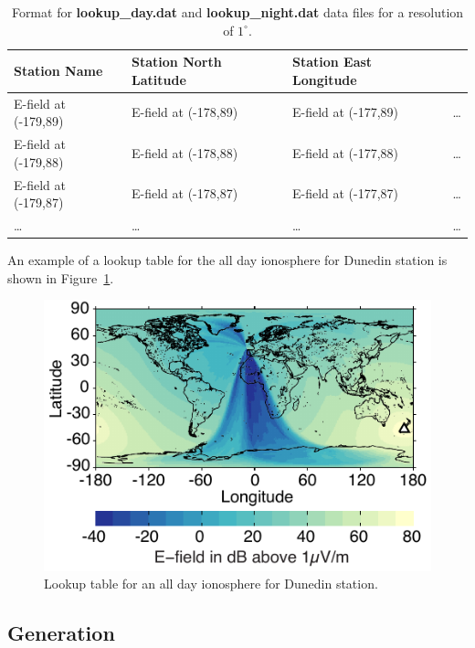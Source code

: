 \begin{table}[h!]
\begin{center}
\begin{tabular}{|p{1.5in}|p{1.75in}|p{1.75in}|p{0.5in}|}
\hline
\rule{0pt}{3ex}
Station Name	&Station North Latitude	&	Station East Longitude & \\ 
\hline
\rule{0pt}{3ex}
E-field at (-179,89)	& E-field at (-178,89) &	E-field at (-177,89) & \dots \\ 
\hline
\rule{0pt}{3ex}
E-field at (-179,88)	& E-field at (-178,88) &	E-field at (-177,88) & \dots \\ 
\hline
\rule{0pt}{3ex}
E-field at (-179,87)	& E-field at (-178,87) &	E-field at (-177,87) & \dots \\ 
\hline
\rule{0pt}{3ex}
\dots	& \dots &	\dots & \dots \\ 
\hline
\end{tabular}
\end{center}
\caption{Format for \textbf{lookup\_day.dat} and \textbf{lookup\_night.dat} data files for a resolution of $1^\circ$.}
\label{bootstrap:table:lookup}
\end{table}

An example of a lookup table for the all day ionosphere for Dunedin station is shown in Figure~\ref{bootstrap:fig:lookup}.

\begin{figure}[ht!]
   \centering
   \includegraphics[scale=1]{Introduction/Figures/lwpc_lookup.pdf} 
   \caption{Lookup table for an all day ionosphere for Dunedin station.}
   \label{bootstrap:fig:lookup}
\end{figure}

\subsection{Generation}

